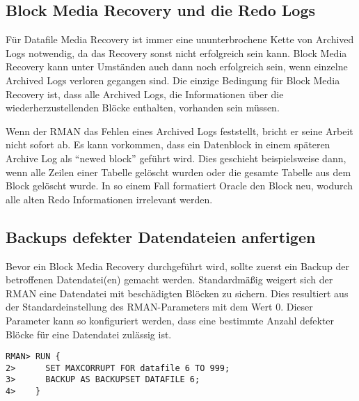       \subsection{Block Media Recovery und die Redo Logs}
        Für Datafile Media Recovery ist immer eine ununterbrochene Kette von Archived Logs notwendig, da das Recovery sonst nicht erfolgreich sein kann. Block Media Recovery kann unter Umständen auch dann noch erfolgreich sein, wenn einzelne Archived Logs verloren gegangen sind. Die einzige Bedingung für Block Media Recovery ist, dass alle Archived Logs, die Informationen über die wiederherzustellenden Blöcke enthalten, vorhanden sein müssen.

        Wenn der RMAN das Fehlen eines Archived Logs feststellt, bricht er seine Arbeit nicht sofort ab. Es kann vorkommen, dass ein Datenblock in einem späteren Archive Log als \enquote{newed block} geführt wird. Dies geschieht beispielsweise dann, wenn alle Zeilen einer Tabelle gelöscht wurden oder die gesamte Tabelle aus dem Block gelöscht wurde.
        In so einem Fall formatiert Oracle den Block neu, wodurch alle alten Redo Informationen irrelevant werden.
      \subsection{Backups defekter Datendateien anfertigen}
        \label{corruptfile}
        Bevor ein Block Media Recovery durchgeführt wird, sollte zuerst ein Backup der betroffenen Datendatei(en) gemacht werden. Standardmäßig weigert sich der RMAN eine Datendatei mit beschädigten Blöcken zu sichern. Dies resultiert aus der Standardeinstellung des RMAN-Parameters  mit dem Wert 0. Dieser Parameter kann so konfiguriert werden, dass eine bestimmte Anzahl defekter Blöcke für eine Datendatei zulässig ist.
        \begin{lstlisting}[caption={Hotbackup einer defekten Datendatei anfertigen},label=admin1493,language=rman]
RMAN> RUN {
2>      SET MAXCORRUPT FOR datafile 6 TO 999;
3>      BACKUP AS BACKUPSET DATAFILE 6;
4>    }
        \end{lstlisting}
